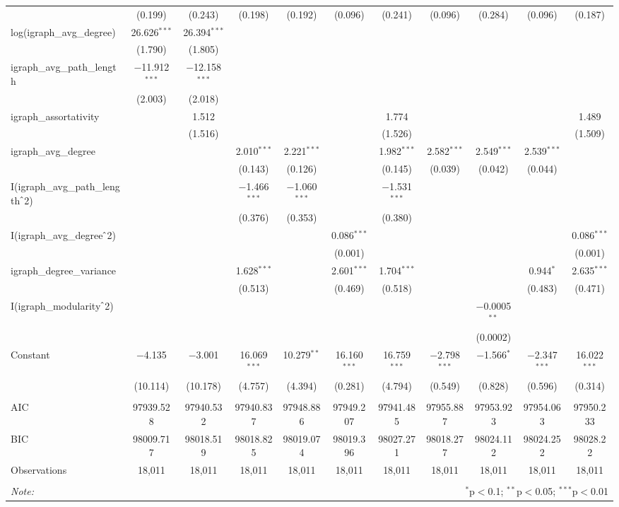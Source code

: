 \begin{table}[!htbp]
\begin{tabular}{@{\extracolsep{5pt}}lcccccccccc}
  & (0.199) & (0.243) & (0.198) & (0.192) & (0.096) & (0.241) & (0.096) & (0.284) & (0.096) & (0.187) \\ 
  log(igraph\_avg\_degree) & 26.626$^{***}$ & 26.394$^{***}$ &  &  &  &  &  &  &  &  \\ 
  & (1.790) & (1.805) &  &  &  &  &  &  &  &  \\ 
  igraph\_avg\_path\_length & $-$11.912$^{***}$ & $-$12.158$^{***}$ &  &  &  &  &  &  &  &  \\ 
  & (2.003) & (2.018) &  &  &  &  &  &  &  &  \\ 
  igraph\_assortativity &  & 1.512 &  &  &  & 1.774 &  &  &  & 1.489 \\ 
  &  & (1.516) &  &  &  & (1.526) &  &  &  & (1.509) \\ 
  igraph\_avg\_degree &  &  & 2.010$^{***}$ & 2.221$^{***}$ &  & 1.982$^{***}$ & 2.582$^{***}$ & 2.549$^{***}$ & 2.539$^{***}$ &  \\ 
  &  &  & (0.143) & (0.126) &  & (0.145) & (0.039) & (0.042) & (0.044) &  \\ 
  I(igraph\_avg\_path\_length$\hat{\mkern6mu}$2) &  &  & $-$1.466$^{***}$ & $-$1.060$^{***}$ &  & $-$1.531$^{***}$ &  &  &  &  \\ 
  &  &  & (0.376) & (0.353) &  & (0.380) &  &  &  &  \\ 
  I(igraph\_avg\_degree$\hat{\mkern6mu}$2) &  &  &  &  & 0.086$^{***}$ &  &  &  &  & 0.086$^{***}$ \\ 
  &  &  &  &  & (0.001) &  &  &  &  & (0.001) \\ 
  igraph\_degree\_variance &  &  & 1.628$^{***}$ &  & 2.601$^{***}$ & 1.704$^{***}$ &  &  & 0.944$^{*}$ & 2.635$^{***}$ \\ 
  &  &  & (0.513) &  & (0.469) & (0.518) &  &  & (0.483) & (0.471) \\ 
  I(igraph\_modularity$\hat{\mkern6mu}$2) &  &  &  &  &  &  &  & $-$0.0005$^{**}$ &  &  \\ 
  &  &  &  &  &  &  &  & (0.0002) &  &  \\ 
  Constant & $-$4.135 & $-$3.001 & 16.069$^{***}$ & 10.279$^{**}$ & 16.160$^{***}$ & 16.759$^{***}$ & $-$2.798$^{***}$ & $-$1.566$^{*}$ & $-$2.347$^{***}$ & 16.022$^{***}$ \\ 
  & (10.114) & (10.178) & (4.757) & (4.394) & (0.281) & (4.794) & (0.549) & (0.828) & (0.596) & (0.314) \\ 
 \hline \\[-1.8ex] 
AIC & 97939.528 & 97940.532 & 97940.837 & 97948.886 & 97949.207 & 97941.485 & 97955.887 & 97953.923 & 97954.063 & 97950.233 \\ 
BIC & 98009.717 & 98018.519 & 98018.825 & 98019.074 & 98019.396 & 98027.271 & 98018.277 & 98024.112 & 98024.252 & 98028.22 \\ 
Observations & 18,011 & 18,011 & 18,011 & 18,011 & 18,011 & 18,011 & 18,011 & 18,011 & 18,011 & 18,011 \\ 
\hline 
\hline \\[-1.8ex] 
\textit{Note:}  & \multicolumn{10}{r}{$^{*}$p$<$0.1; $^{**}$p$<$0.05; $^{***}$p$<$0.01} \\ 
\end{tabular} 
\end{table} 
